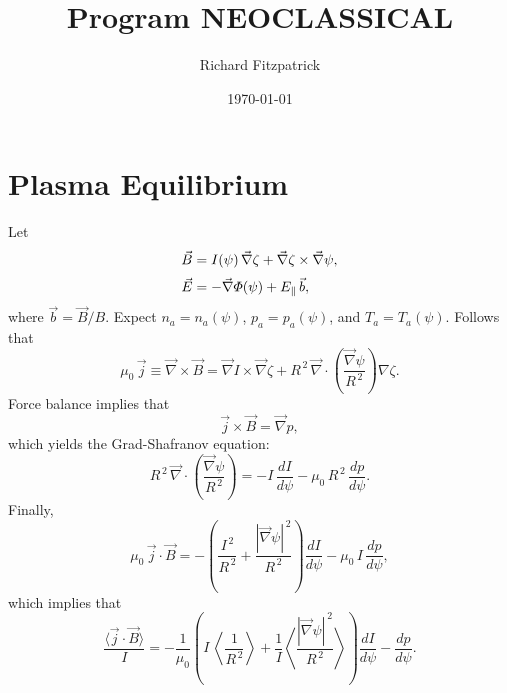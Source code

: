 \documentclass[notitlepage,12pt]{article}
\title{\bf Program NEOCLASSICAL}
\date{\today}
\author{Richard Fitzpatrick}
\begin{document}
\maketitle


\section{Plasma Equilibrium}
Let
\begin{align}
\vec{B} &= I(\psi)\,\vec{\nabla} \zeta + \vec{\nabla}\zeta\times \vec{\nabla}\psi,\\[0.5ex]
\vec{E} &= -\vec{\nabla}{\mit\Phi}(\psi) + E_\parallel\,\vec{b}, 
\end{align}
where $\vec{b}=\vec{B}/B$.
Expect $n_a=n_a(\psi)$, $p_a=p_a(\psi)$, and $T_a= T_a(\psi)$.
Follows that
\begin{equation}
\mu_0\,\vec{j} \equiv \vec{\nabla}\times \vec{B} = \vec{\nabla}I \times \vec{\nabla}\zeta + R^{\,2}\,\vec{\nabla}\cdot\left(\frac{\vec{\nabla}\psi}{R^{\,2}}\right)\nabla\zeta.
\end{equation}
Force balance implies that
\begin{equation}
\vec{j}\times \vec{B} = \vec{\nabla} p,
\end{equation}
which yields the Grad-Shafranov equation:
\begin{equation}
R^{\,2}\,\vec{\nabla}\cdot\left(\frac{\vec{\nabla}\psi}{R^{\,2}}\right) = - I\,\frac{dI}{d\psi} -\mu_0\,R^{\,2}\,\frac{dp}{d\psi}.
\end{equation}
Finally,
\begin{equation}
\mu_0\,\vec{j}\cdot\vec{B} = -\left(\frac{I^{\,2}}{R^{\,2}} + \frac{|\vec{\nabla}\psi|^{\,2}}{R^{\,2}}\right)\frac{dI}{d\psi}
-\mu_0\, I\,\frac{dp}{d\psi},
\end{equation}
which implies that
\begin{equation}
\frac{\langle \vec{j}\cdot\vec{B}\rangle}{I} = -\frac{1}{\mu_0}\left(I\,\left\langle\frac{1}{R^{\,2}}\right\rangle + \frac{1}{I}\left\langle
\frac{|\vec{\nabla}\psi|^{\,2}}{R^{\,2}}\right\rangle\right)\frac{dI}{d\psi}-\frac{dp}{d\psi}.
\end{equation}
\end{document}
